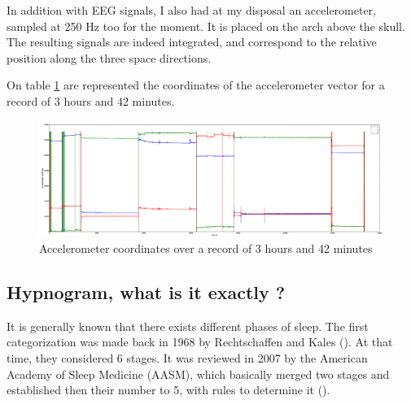 \documentclass[12pt]{report}
\begin{document}
In addition with EEG signals, I also had at my disposal an accelerometer, sampled at 250 Hz too for the moment. It is placed on the arch above the skull. The resulting signals are indeed integrated, and correspond to the relative position along the three space directions.

On table \ref{fig:acc_night} are represented the coordinates of the accelerometer vector for a record of 3 hours and 42 minutes.

\begin{figure}[H]
\centering
\includegraphics[width=1\textwidth]{img/chap2/acc_night.png}
\caption{\label{fig:acc_night}Accelerometer coordinates over a record of 3 hours and 42 minutes}
\end{figure}

\subsection{Hypnogram, what is it exactly ?}

It is generally known that there exists different phases of sleep. The first categorization was made back in 1968 by Rechtschaffen and Kales (\cite{rechtschaffen1968manual}). At that time, they considered 6 stages. It was reviewed in 2007 by the American Academy of Sleep Medicine (AASM), which basically merged two stages and established then their number to 5, with rules to determine it (\cite{berry2012aasm}).
\end{document}
